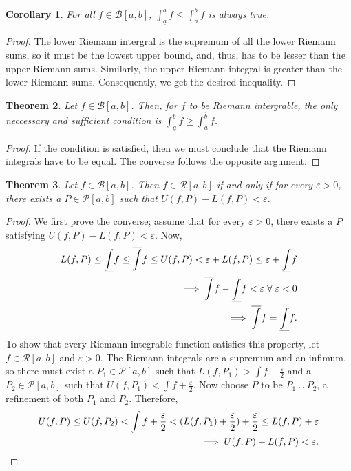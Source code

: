 \documentclass[15pt,a4paper]{book}
\newtheorem{theorem}{Theorem}[chapter]
\newtheorem{corollary}[theorem]{Corollary}
\theoremstyle{definition}
\newcommand{\cP}{\mathcal{P}}
\newcommand{\cR}{\mathcal{R}}
\newcommand{\cB}{\mathcal{B}}
\begin{document}
\begin{corollary}
    For all $f \in \cB [a,b]$, $\int_{\underline{a}}^{b} f \leq \int_{a}^{\overline{b}} f$ is always true.
\end{corollary}
\begin{proof}
    The lower Riemann intergral is the supremum of all the lower Riemann sums, so it must be the lowest upper bound, and, thus, has to be lesser than the upper Riemann sums. Similarly, the upper Riemann integral is greater than the lower Riemann sums. Consequently, we get the desired inequality.
\end{proof}
\begin{theorem}
    Let $f \in \cB [a,b]$. Then, for $f$ to be Riemann intergrable, the only neccessary and sufficient condition is $\int_{\underline{a}}^{b} f \geq \int_{a}^{\overline{b}} f$.
\end{theorem}
\begin{proof}
    If the condition is satisfied, then we must conclude that the Riemann integrals have to be equal. The converse follows the opposite argument.
\end{proof}
\begin{theorem}
    Let $f \in \cB [a,b]$. Then $f \in \cR [a,b]$ if and only if for every $\varepsilon > 0$, there exists a $P \in \cP [a,b]$ such that $U(f,P) - L(f,P) < \varepsilon$.
\end{theorem}
\begin{proof}
    We first prove the converse; assume that for every $\varepsilon > 0$, there exists a $P$ satisfying $U(f,P) - L(f,P) < \varepsilon$. Now,
    \begin{align}
        L(f,P) \leq \underline{\int} f \leq \overline{\int} f \leq U(f,P) < \varepsilon + L(f,P) \leq \varepsilon + \underline{\int} f \notag \\
        \implies \overline{\int} f - \underline{\int} f < \varepsilon \; \forall \; \varepsilon < 0\\
        \implies \overline{\int} f = \underline{\int} f.
    \end{align}
    To show that every Riemann integrable function satisfies this property, let $f \in \cR [a,b]$ and $\varepsilon > 0$. The Riemann integrals are a supremum and an infimum, so there must exist a $P_{1} \in \cP [a,b]$ such that $L(f,P_{1}) > \int f - \frac{\varepsilon}{2}$ and a $P_{2} \in \cP [a,b]$ such that $U(f,P_{1}) < \int f + \frac{\varepsilon}{2}$. Now choose $P$ to be $P_{1} \cup P_{2}$, a refinement of both $P_{1}$ and $P_{2}$. Therefore,
    \begin{align}
        U(f,P) \leq U(f,P_{2}) < \int f + \frac{\varepsilon}{2} < (L(f,P_{1}) + \frac{\varepsilon}{2}) + \frac{\varepsilon}{2} \leq L(f,P) + \varepsilon \notag \\
        \implies U(f,P) - L(f,P) < \varepsilon.
    \end{align}
\end{proof}
\end{document}
